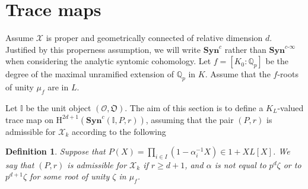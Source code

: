 \documentclass[asterisque,english]{smfart}
\newtheorem{definition}{Definition}[]
\newcommand{\ges}{\geqslant}
\begin{document}
\section{Trace maps}\label{sec:trace}

Assume $\mathcal{X}$ is proper and geometrically connected of relative dimension $d$.
Justified by this properness assumption, we will write $\mathbf{Syn}^{c}$ rather than $\mathbf{Syn}^{c\text{-}\infty }$ when considering the analytic syntomic cohomology. Let $f=[K_0:\mathbb{Q}_p]$ be the degree of the maximal unramified extension of $\mathbb{Q}_p$ in $K$. Assume that the $f$-roots of unity $\mu_f$ are in $L$. 

Let $\mathbb{I}$ be the unit object $\left( \mathcal{O},\mathfrak{O}\right)$. The aim of this section is to define a $K_{L}$-valued trace map on $\mathrm{H}^{2d+1}\left( \mathbf{Syn}^{c}\left( 
\mathbb{I},P,r\right) \right)$, assuming that the pair $(P,r)$ is admissible for $\mathcal{X}_{k}$ according to the  following  

\begin{definition}\label{def:CupProd DefAdm}
Suppose that $P\left( X\right) =\prod\nolimits_{i\in I}\left( 1-\alpha
_{i}^{-1}X\right) \in 1+XL\left[ X\right] $. We say that $\left( P,r\right) $
is admissible for $\mathcal{X}_{k}$ if $r\ges{} d+1$, and $\alpha$ is not equal to 
$p^{d}\zeta$ or to  $p^{d+1}\zeta$ for some root of unity $\zeta$ in $\mu_f$. 
\end{definition}
\end{document}
